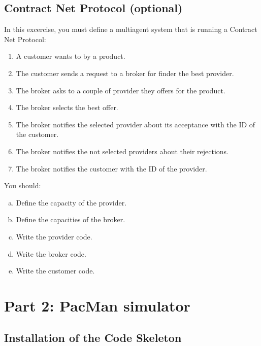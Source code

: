 \documentclass[article,english,nodocumentinfo]{utbmciadreport}
\begin{document}
\subsection{Contract Net Protocol (optional)}

In this excercise, you must define a multiagent system that is running a Contract Net Protocol:
\begin{enumerate}
\item A customer wants to by a product.
\item The customer sends a request to a broker for finder the best provider.
\item The broker asks to a couple of provider they offers for the product.
\item The broker selects the best offer.
\item The broker notifies the selected provider about its acceptance with the ID of the customer.
\item The broker notifies the not selected providers about their rejections.
\item The broker notifies the customer with the ID of the provider.
\end{enumerate}

You should:
\begin{enumerate}[a)]
\item Define the capacity of the provider.
\item Define the capacities of the broker.
\item Write the provider code.
\item Write the broker code.
\item Write the customer code.
\end{enumerate}



\section{Part 2: PacMan simulator}

\subsection{Installation of the Code Skeleton}
\end{document}
